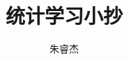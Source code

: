 \documentclass{ctexart}
\title{统计学习小抄}
\author{朱睿杰}
\begin{document}
\setlength{\columnsep}{0.2cm}
\setlength\columnseprule{.4pt}

\begin{multicols*}{5}
\sffamily

\linespread{1.0}
\setlength{\normalbaselineskip}{6bp}
\setlength{\baselineskip}{6bp}
\setlength{\lineskiplimit}{0pt}
\setlength{\lineskip}{0pt}
\setlength{\parindent}{1em}
\setlength{\parskip}{0pt}
\setlength{\abovedisplayskip}{0pt}
\setlength{\belowdisplayskip}{0pt}
\setlength{\abovedisplayshortskip}{0pt}
\setlength{\belowdisplayshortskip}{0pt}

\newenvironment{sequation}{\begin{equation}\small}{\end{equation}}




\end{multicols*}
\end{document}

